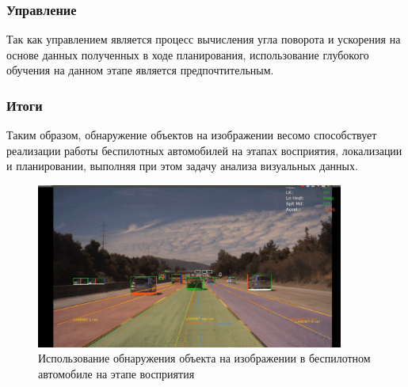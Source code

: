 \documentclass[bachelor, och, coursework]{SCWorks}
\begin{document}
        \subsubsection{Управление}
            Так как управлением является процесс вычисления угла поворота и ускорения на основе данных полученных в ходе планирования, использование глубокого обучения на данном этапе является предпочтительным.
        
        \subsubsection{Итоги}
            Таким образом, обнаружение объектов на изображении весомо способствует реализации работы беспилотных автомобилей на этапах восприятия, локализации и планировании, выполняя при этом задачу анализа визуальных данных.\\
            \begin{figure}[H]
                \centering
                \includegraphics[width=0.9\textwidth]{pic/auto.png}
                \caption{Использование обнаружения объекта на изображении в беспилотном автомобиле на этапе восприятия}
                \label{fig:img20}
            \end{figure}
\end{document}
